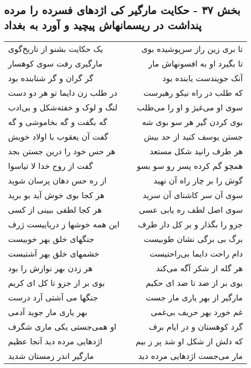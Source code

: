 \begin{center}
\section*{بخش ۳۷ - حکایت مارگیر کی اژدهای فسرده را مرده پنداشت در ریسمانهاش پیچید و  آورد به بغداد}
\label{sec:sh037}
\begin{longtable}{l p{0.5cm} r}
یک حکایت بشنو از تاریخ‌گوی
&&
تا بری زین راز سرپوشیده بوی
\\
مارگیری رفت سوی کوهسار
&&
تا بگیرد او به افسونهاش مار
\\
گر گران و گر شتابنده بود
&&
آنک جویندست یابنده بود
\\
در طلب زن دایما تو هر دو دست
&&
که طلب در راه نیکو رهبرست
\\
لنگ و لوک و خفته‌شکل و بی‌ادب
&&
سوی او می‌غیژ و او را می‌طلب
\\
گه بگفت و گه بخاموشی و گه
&&
بوی کردن گیر هر سو بوی شه
\\
گفت آن یعقوب با اولاد خویش
&&
جستن یوسف کنید از حد بیش
\\
هر حس خود را درین جستن بجد
&&
هر طرف رانید شکل مستعد
\\
گفت از روح خدا لا تیاسوا
&&
همچو گم کرده پسر رو سو بسو
\\
از ره حس دهان پرسان شوید
&&
گوش را بر چار راه آن نهید
\\
هر کجا بوی خوش آید بو برید
&&
سوی آن سر کاشنای آن سرید
\\
هر کجا لطفی ببینی از کسی
&&
سوی اصل لطف ره یابی عسی
\\
این همه خوشها ز دریاییست ژرف
&&
جزو را بگذار و بر کل دار طرف
\\
جنگهای خلق بهر خوبیست
&&
برگ بی برگی نشان طوبیست
\\
خشمهای خلق بهر آشتیست
&&
دام راحت دایما بی‌راحتیست
\\
هر زدن بهر نوازش را بود
&&
هر گله از شکر آگه می‌کند
\\
بوی بر از جزو تا کل ای کریم
&&
بوی بر از ضد تا ضد ای حکیم
\\
جنگها می آشتی آرد درست
&&
مارگیر از بهر یاری مار جست
\\
بهر یاری مار جوید آدمی
&&
غم خورد بهر حریف بی‌غمی
\\
او همی‌جستی یکی ماری شگرف
&&
گرد کوهستان و در ایام برف
\\
اژدهایی مرده دید آنجا عظیم
&&
که دلش از شکل او شد پر ز بیم
\\
مارگیر اندر زمستان شدید
&&
مار می‌جست اژدهایی مرده دید
\\

\end{longtable}
\end{center}

